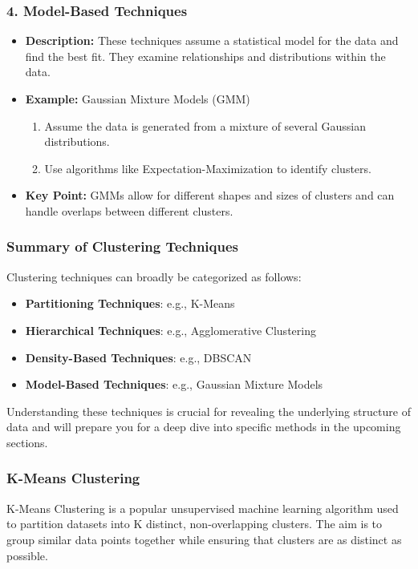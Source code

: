 \documentclass[aspectratio=169]{beamer}
\begin{document}
\begin{frame}[fragile]
    \frametitle{4. Model-Based Techniques}
    \begin{itemize}
        \item \textbf{Description:} These techniques assume a statistical model for the data and find the best fit. They examine relationships and distributions within the data.
        \item \textbf{Example:} Gaussian Mixture Models (GMM)
        \begin{enumerate}
            \item Assume the data is generated from a mixture of several Gaussian distributions.
            \item Use algorithms like Expectation-Maximization to identify clusters.
        \end{enumerate}
        \item \textbf{Key Point:} GMMs allow for different shapes and sizes of clusters and can handle overlaps between different clusters.
    \end{itemize}
\end{frame}

\begin{frame}[fragile]
    \frametitle{Summary of Clustering Techniques}
    Clustering techniques can broadly be categorized as follows:
    \begin{itemize}
        \item \textbf{Partitioning Techniques}: e.g., K-Means
        \item \textbf{Hierarchical Techniques}: e.g., Agglomerative Clustering
        \item \textbf{Density-Based Techniques}: e.g., DBSCAN
        \item \textbf{Model-Based Techniques}: e.g., Gaussian Mixture Models
    \end{itemize}
    Understanding these techniques is crucial for revealing the underlying structure of data and will prepare you for a deep dive into specific methods in the upcoming sections.
\end{frame}

\begin{frame}[fragile]
    \frametitle{K-Means Clustering}
    K-Means Clustering is a popular unsupervised machine learning algorithm used to partition datasets into K distinct, non-overlapping clusters. 
    The aim is to group similar data points together while ensuring that clusters are as distinct as possible.
\end{frame}
\end{document}
